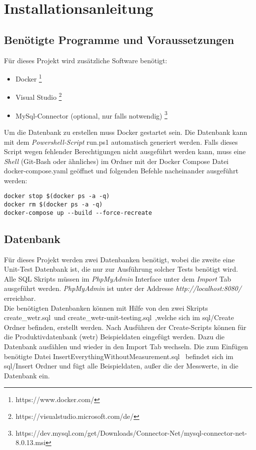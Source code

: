 \section{Installationsanleitung}

\subsection{Benötigte Programme und Voraussetzungen}
Für dieses Projekt wird zusätzliche Software benötigt:
\begin{itemize}
\item Docker \footnote{https://www.docker.com/}
\item Visual Studio \footnote{https://visualstudio.microsoft.com/de/}
\item MySql-Connector (optional, nur falls notwendig) \footnote{https://dev.mysql.com/get/Downloads/Connector-Net/mysql-connector-net-8.0.13.msi}
\end{itemize}
\raggedright

Um die Datenbank zu erstellen muss Docker gestartet sein. Die Datenbank kann mit dem \textit{Powershell-Script} \grqq{}run.ps1 \grqq{} automatisch generiert werden.
Falls dieses Script wegen fehlender Berechtigungen nicht ausgeführt werden kann, muss eine \textit{Shell} (Git-Bash oder ähnliches) im Ordner mit der Docker Compose Datei \grqq{}docker-compose.yaml \grqq{} geöffnet und folgenden Befehle nacheinander ausgeführt werden:

\begin{verbatim}
docker stop $(docker ps -a -q)
docker rm $(docker ps -a -q)
docker-compose up --build --force-recreate
\end{verbatim}

\subsection{Datenbank}
Für dieses Projekt werden zwei Datenbanken benötigt, wobei die zweite eine Unit-Test Datenbank ist, die nur zur Ausführung solcher Tests benötigt wird.\\

Alle SQL Skripts müssen im \textit{PhpMyAdmin} Interface unter dem \textit{Import} Tab ausgeführt werden. \textit{PhpMyAdmin} ist unter der Addresse \grqq{}\textit{http://localhost:8080/}\grqq{} erreichbar.\\

Die benötigten Datenbanken können mit Hilfe von den zwei Skripts \glqq create\_wetr.sql\grqq\ und \glqq create\_wetr-unit-testing.sql\grqq\ ,welche sich im sql/Create Ordner befinden, erstellt werden. 
\newline\newline
Nach Ausführen der Create-Scripts können für die Produktivdatenbank (wetr) Beispieldaten eingefügt werden. Dazu die Datenbank ausfählen und wieder in den Import Tab wechseln. Die zum Einfügen benötigte Datei \glqq InsertEverythingWithoutMeasurement.sql \grqq\ befindet sich im sql/Insert Ordner und fügt alle Beispieldaten, außer die der Messwerte, in die Datenbank ein.\\

